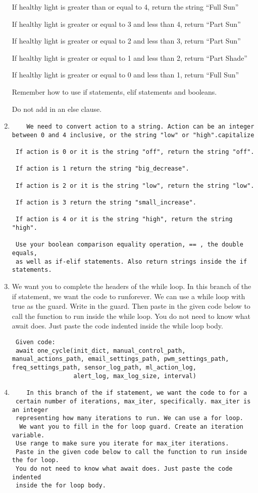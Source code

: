 \documentclass[
]{article}
\begin{document}
\begin{enumerate}
  If healthy light is greater than or equal to 4, return the string
  ``Full Sun''

  If healthy light is greater or equal to 3 and less than 4, return
  ``Part Sun''

  If healthy light is greater or equal to 2 and less than 3, return
  ``Part Sun''

  If healthy light is greater or equal to 1 and less than 2, return
  ``Part Shade''

  If healthy light is greater or equal to 0 and less than 1, return
  ``Full Sun''

  Remember how to use if statements, elif statements and booleans.

  Do not add in an else clause.
\item
\begin{verbatim}
    We need to convert action to a string. Action can be an integer between 0 and 4 inclusive, or the string "low" or "high".capitalize

 If action is 0 or it is the string "off", return the string "off".

 If action is 1 return the string "big_decrease".

 If action is 2 or it is the string "low", return the string "low".

 If action is 3 return the string "small_increase".

 If action is 4 or it is the string "high", return the string "high".

 Use your boolean comparison equality operation, == , the double equals,
 as well as if-elif statements. Also return strings inside the if statements.
\end{verbatim}
\item
  We want you to complete the headers of the while loop. In this branch
  of the if statement, we want the code to runforever. We can use a
  while loop with true as the guard. Write in the guard. Then paste in
  the given code below to call the function to run inside the while
  loop. You do not need to know what await does. Just paste the code
  indented inside the while loop body.

\begin{verbatim}
 Given code:
 await one_cycle(init_dict, manual_control_path, manual_actions_path, email_settings_path, pwm_settings_path, freq_settings_path, sensor_log_path, ml_action_log,
                 alert_log, max_log_size, interval)
\end{verbatim}
\item
\begin{verbatim}
    In this branch of the if statement, we want the code to for a
 certain number of iterations, max_iter, specifically. max_iter is an integer
 representing how many iterations to run. We can use a for loop.
  We want you to fill in the for loop guard. Create an iteration variable.
 Use range to make sure you iterate for max_iter iterations.
 Paste in the given code below to call the function to run inside the for loop.
 You do not need to know what await does. Just paste the code indented
 inside the for loop body.


\end{verbatim}
\end{enumerate}
\end{document}
